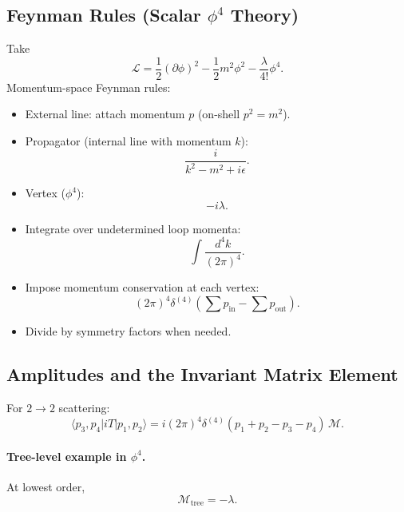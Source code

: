 \subsection{Feynman Rules (Scalar $\phi^4$ Theory)}
Take
\begin{equation}
\mathcal{L}=\frac12(\partial\phi)^2-\frac12 m^2\phi^2-\frac{\lambda}{4!}\phi^4.
\end{equation}
Momentum-space Feynman rules:
\begin{itemize}
\item External line: attach momentum $p$ (on-shell $p^2=m^2$).
\item Propagator (internal line with momentum $k$):
\begin{equation}
\frac{i}{k^2-m^2+i\epsilon}.
\end{equation}
\item Vertex ($\phi^4$):
\begin{equation}
-i\lambda.
\end{equation}
\item Integrate over undetermined loop momenta:
\begin{equation}
\int \frac{d^4k}{(2\pi)^4}.
\end{equation}
\item Impose momentum conservation at each vertex:
\begin{equation}
(2\pi)^4\delta^{(4)}\!\left(\sum p_{\mathrm{in}}-\sum p_{\mathrm{out}}\right).
\end{equation}
\item Divide by symmetry factors when needed.
\end{itemize}

\subsection{Amplitudes and the Invariant Matrix Element}
For $2\to 2$ scattering:
\begin{equation}
\langle p_3,p_4|iT|p_1,p_2\rangle
=
i(2\pi)^4\delta^{(4)}(p_1+p_2-p_3-p_4)\,\mathcal{M}.
\end{equation}

\paragraph{Tree-level example in $\phi^4$.}
At lowest order,
\begin{equation}
\mathcal{M}_{\text{tree}} = -\lambda.
\end{equation}

